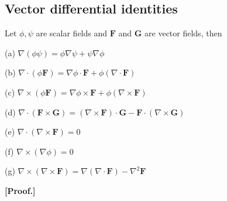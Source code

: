 \documentclass[11pt, a4paper]{MATH2023}
\begin{document}
\begin{spacing}{1.3}
    \newpage
    \subsection{Vector differential identities}
    Let $\phi, \psi$ are scalar fields and $\mathbf{F}$ and $\mathbf{G}$ are vector fields, then

    (a) $\nabla(\phi \psi)=\phi \nabla \psi+\psi \nabla \phi$

    (b) $\nabla \cdot(\phi \mathbf{F})=\nabla \phi \cdot \mathbf{F}+\phi(\nabla \cdot \mathbf{F})$

    (c) $\nabla \times(\phi \mathbf{F})=\nabla \phi \times \mathbf{F}+\phi(\nabla \times \mathbf{F})$

    (d) $\nabla \cdot(\mathbf{F} \times \mathbf{G})=(\nabla \times \mathbf{F}) \cdot \mathbf{G}-\mathbf{F} \cdot(\nabla \times \mathbf{G})$
    
    (e) $\nabla \cdot(\nabla \times \mathbf{F})=0$
    
    (f) $\nabla \times(\nabla \phi)=0$
    
    (g) $\nabla \times(\nabla \times \mathbf{F})=\nabla(\nabla \cdot \mathbf{F})-\nabla^{2} \mathbf{F}$

    \vspace{0.2in}
    {\bf [Proof.]}

    

\end{spacing}
\end{document}
